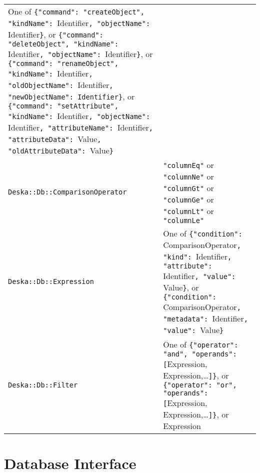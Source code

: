 \documentclass{article}
\begin{document}
\begin{longtable}{ p{60mm} p{90mm} }
        One of \newline
        {\tt \{"command": "createObject", "kindName": }Identifier{\tt, "objectName": }Identifier{\tt \}}, \newline
        or \newline
        {\tt \{"command": "deleteObject", "kindName": }Identifier{\tt, "objectName": }Identifier{\tt \}}, \newline
        or \newline
        {\tt \{"command": "renameObject", "kindName": }Identifier{\tt, "oldObjectName": }Identifier{\tt,
        "newObjectName": }{\tt Identifier\}}, \newline
        or \newline
        {\tt \{"command": "setAttribute", "kindName": }Identifier{\tt, "objectName": }Identifier{\tt, "attributeName":
        }Identifier{\tt, "attributeData": }Value{\tt, "oldAttributeData": }Value{\tt \}} \\
    {\tt Deska::Db::ComparisonOperator} &
        {\tt "columnEq"} or {\tt "columnNe"} or {\tt "columnGt"} or {\tt "columnGe"} or {\tt "columnLt"} or
        {\tt "columnLe"}
        \\
    {\tt Deska::Db::Expression} &
        One of \newline
        {\tt \{"condition": }ComparisonOperator{\tt, "kind": }Identifier{\tt, "attribute": }Identifier{\tt, "value":
        }Value{\tt \}}, \newline
        or \newline
        {\tt \{"condition": }ComparisonOperator{\tt, "metadata": }Identifier{\tt, "value": }Value{\tt \}}
        \\
    {\tt Deska::Db::Filter} &
        One of \newline
        {\tt \{"operator": "and", "operands": [}Expression, Expression,\ldots{\tt]\}}, \newline
        or \newline
        {\tt \{"operator": "or", "operands": [}Expression, Expression,\ldots{\tt]\}}, \newline
        or \newline
        Expression

\end{longtable}

\section{Database Interface}
\end{document}
